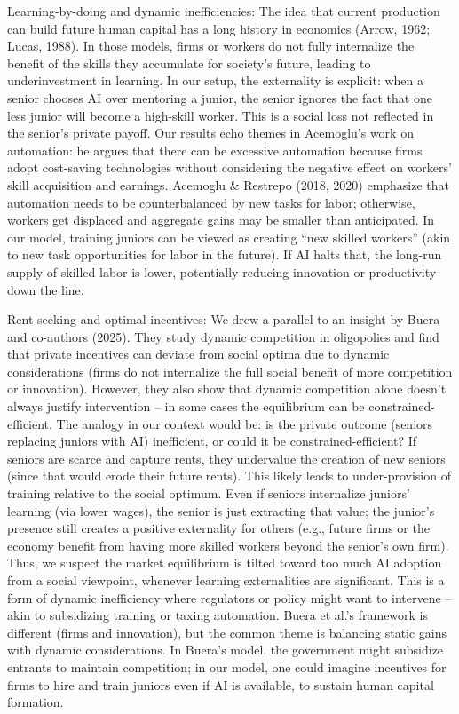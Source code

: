 \documentclass[12pt]{article}
\begin{document}
{Learning-by-doing and dynamic inefficiencies:} The idea that
current production can build future human capital has a long history
in economics (Arrow, 1962; Lucas, 1988). In those models, firms or
workers do not fully internalize the benefit of the skills they
accumulate for society's future, leading to underinvestment in
learning. In our setup, the externality is explicit: when a senior
chooses AI over mentoring a junior, the senior ignores the fact that
one less junior will become a high-skill worker. This is a social loss
not reflected in the senior's private payoff. Our results echo themes
in Acemoglu's work on automation: he argues that there can be
{excessive automation} because firms adopt cost-saving
technologies without considering the negative effect on workers' skill
acquisition and earnings. Acemoglu \& Restrepo (2018, 2020) emphasize
that automation needs to be counterbalanced by new tasks for labor;
otherwise, workers get displaced and aggregate gains may be smaller
than anticipated. In our model, training juniors can be viewed as
creating ``new skilled workers'' (akin to new task opportunities for
labor in the future). If AI halts that, the long-run supply of skilled
labor is lower, potentially reducing innovation or productivity down
the line.

{Rent-seeking and optimal incentives:} We drew a parallel to an
insight by Buera and co-authors (2025). They study dynamic competition
in oligopolies and find that private incentives can deviate from
social optima due to dynamic considerations (firms do not internalize
the full social benefit of more competition or innovation). However,
they also show that {dynamic competition alone doesn't always
justify intervention} -- in some cases the equilibrium can be
constrained-efficient. The analogy in our context would be: is the
private outcome (seniors replacing juniors with AI) inefficient, or
could it be constrained-efficient? If seniors are scarce and capture
rents, they undervalue the creation of new seniors (since that would
erode their future rents). This likely leads to {under-provision
of training} relative to the social optimum. Even if seniors
internalize juniors' learning (via lower wages), the senior is just
extracting that value; the junior's presence still creates a positive
externality for others (e.g., future firms or the economy benefit from
having more skilled workers beyond the senior's own firm). Thus, we
suspect the market equilibrium is tilted toward too much AI adoption
from a social viewpoint, whenever learning externalities are
significant. This is a form of dynamic inefficiency where regulators
or policy might want to intervene -- akin to subsidizing training or
taxing automation. Buera et al.'s framework is different (firms and
innovation), but the common theme is balancing static gains with
dynamic considerations. In Buera's model, the government might
subsidize entrants to maintain competition; in our model, one could
imagine {incentives for firms to hire and train juniors} even
if AI is available, to sustain human capital formation.
\end{document}
